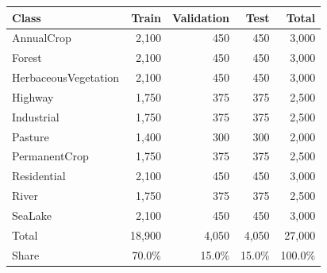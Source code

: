 \begin{tabular}{lrrrr}
\toprule
Class & Train & Validation & Test & Total \\
\midrule
AnnualCrop & 2{,}100 & 450 & 450 & 3{,}000 \\
Forest & 2{,}100 & 450 & 450 & 3{,}000 \\
HerbaceousVegetation & 2{,}100 & 450 & 450 & 3{,}000 \\
Highway & 1{,}750 & 375 & 375 & 2{,}500 \\
Industrial & 1{,}750 & 375 & 375 & 2{,}500 \\
Pasture & 1{,}400 & 300 & 300 & 2{,}000 \\
PermanentCrop & 1{,}750 & 375 & 375 & 2{,}500 \\
Residential & 2{,}100 & 450 & 450 & 3{,}000 \\
River & 1{,}750 & 375 & 375 & 2{,}500 \\
SeaLake & 2{,}100 & 450 & 450 & 3{,}000 \\
\midrule
Total & 18{,}900 & 4{,}050 & 4{,}050 & 27{,}000 \\
Share & 70.0\% & 15.0\% & 15.0\% & 100.0\% \\
\bottomrule
\end{tabular}
